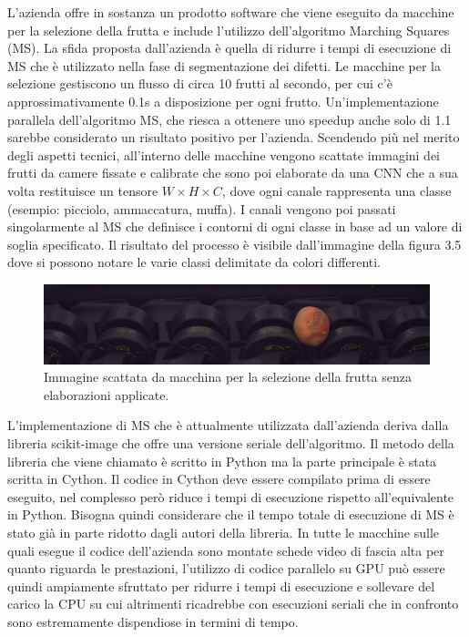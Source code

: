 \documentclass[12pt,a4paper]{report}
\begin{document}
L'azienda offre in sostanza un prodotto software che viene eseguito da macchine per la selezione della frutta e include l’utilizzo dell'algoritmo Marching Squares (MS). La sfida proposta dall'azienda è quella di ridurre i tempi di esecuzione di MS che è utilizzato nella fase di segmentazione dei difetti.
Le macchine per la selezione gestiscono un flusso di circa 10 frutti al secondo, per cui c'è approssimativamente 0.1s a disposizione per ogni frutto. Un’implementazione parallela dell’algoritmo MS, che riesca a ottenere uno speedup anche solo di 1.1 sarebbe considerato un risultato positivo per l’azienda.
Scendendo più nel merito degli aspetti tecnici, all’interno delle macchine vengono scattate immagini dei frutti da camere fissate e calibrate che sono poi elaborate da una CNN che a sua volta restituisce un tensore $W\times H\times C$, dove ogni canale rappresenta una classe (esempio: picciolo, ammaccatura, muffa).
I canali vengono poi passati singolarmente al MS che definisce i contorni di ogni classe in base ad un valore di soglia specificato. Il risultato del processo è visibile dall’immagine della figura 3.5 dove si possono notare le varie classi delimitate da colori differenti. \newline
\begin{figure}[H]
    \centering
    \includegraphics[scale=0.25]{img/marching_squares_00000052_00000001.png}
    \caption{Immagine scattata da macchina per la selezione della frutta senza elaborazioni applicate.}
\end{figure} 

L’implementazione di MS che è attualmente utilizzata dall’azienda deriva dalla libreria scikit-image che offre una versione seriale dell’algoritmo. Il metodo della libreria che viene chiamato è scritto in Python ma la parte principale è stata scritta in Cython.
Il codice in Cython deve essere compilato prima di essere eseguito, nel complesso però riduce i tempi di esecuzione rispetto all’equivalente in Python. Bisogna quindi considerare che il tempo totale di esecuzione di MS è stato già in parte ridotto dagli autori della libreria. \newline
In tutte le macchine sulle quali esegue il codice dell'azienda sono montate schede video di fascia alta per quanto riguarda le prestazioni, l'utilizzo di codice parallelo su GPU può essere quindi ampiamente sfruttato per ridurre i tempi di esecuzione e sollevare del carico la CPU su cui altrimenti ricadrebbe con esecuzioni seriali che in confronto sono estremamente dispendiose in termini di tempo.
\end{document}
